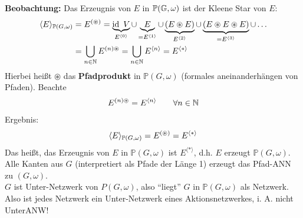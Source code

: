 \textbf{Beobachtung:} Das Erzeugnis von $E$ in $\mathbb{P}(\G,\omega)$ ist der Kleene Star von $E$:
\begin{align*}
    \langle E\rangle_{\mathbb{P}(G,\omega)}
    &=E^{(\circledast)}
    =\underbrace{\id~V}_{E^{\langle0\rangle}}\cup \underbrace{E}_{=E^{\langle1\rangle}}\cup \underbrace{(E\circledast E)}_{E^{\langle2\rangle}}\cup\underbrace{(E\circledast E\circledast E)}_{=E^{\langle3\rangle}}\cup\ldots\\
    &=\bigcup\limits_{n\in\N} E^{(n)\circledast}
    =\bigcup\limits_{n\in\N} E^{\langle n\rangle}
    =E^{\langle\ast\rangle}
\end{align*}
Hierbei heißt $\circledast$ das \textbf{Pfadprodukt} in $\mathbb{P}(G,\omega)$ (formales aneinanderhängen von Pfaden). Beachte
\begin{align*}
    E^{(n)\circledast}=E^{\langle n\rangle}\qquad\forall n\in\N
\end{align*}
Ergebnis:
\begin{align*}
    \langle E\rangle_{\P(G,\omega)}=E^{(\circledast)}=E^{\langle\ast\rangle}
\end{align*}
Das heißt, das Erzeugnis von $E$ in $\mathbb{P}(G,\omega)$ ist $E^{\langle\ast\rangle}$, d.h. $E$ erzeugt $\mathbb{P}(G,\omega)$.\\
Alle Kanten aus $G$ (interpretiert als Pfade der Länge 1) erzeugt das Pfad-ANN zu $(G,\omega)$.\\
$G$ ist Unter-Netzwerk von $P(G,\omega)$, also ``liegt'' $G$ in $\mathbb{P}(G,\omega)$ als Netzwerk.\\
Also ist jedes Netzwerk ein Unter-Netzwerk eines Aktionsnetzwerkes, i. A. nicht UnterANW!

